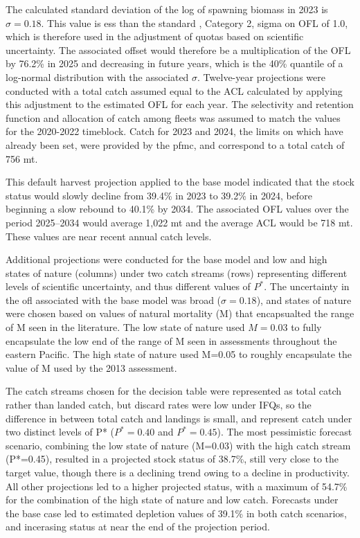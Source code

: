 \documentclass[11pt,
  english,
  letterpaper,
]{article}
\begin{document}
The calculated standard deviation of the log of spawning biomass in 2023 is \(\sigma = 0.18\). This value is ess than the standard , Category 2, sigma on OFL of 1.0, which is therefore used in the adjustment of quotas based on scientific uncertainty. The associated offset would therefore be a multiplication of the OFL by 76.2\% in 2025 and decreasing in future years, which is the 40\% quantile of a log-normal distribution with the associated \(\sigma\). Twelve-year projections were conducted with a total catch assumed equal to the ACL calculated by applying this adjustment to the estimated OFL for each year. The selectivity and retention function and allocation of catch among fleets was assumed to match the values for the 2020-2022 timeblock. Catch for 2023 and 2024, the limits on which have already been set, were provided by the \gls{pfmc}, and correspond to a total catch of 756 mt.

This default harvest projection applied to the base model indicated that the stock status would slowly decline from 39.4\% in 2023 to 39.2\% in 2024, before beginning a slow rebound to 40.1\% by 2034. The associated OFL values over the period 2025--2034 would average 1,022 mt and the average ACL would be 718 mt. These values are near recent annual catch levels.

Additional projections were conducted for the base model and low and high states of nature (columns) under two catch streams (rows) representing different levels of scientific uncertainty, and thus different values of \(P^*\). The uncertainty in the \gls{ofl} associated with the base model was broad (\(\sigma = 0.18\)), and states of nature were chosen based on values of natural mortality (M) that encapsualted the range of M seen in the literature. The low state of nature used \(M=0.03\) to fully encapsulate the low end of the range of M seen in assessments throughout the eastern Pacific. The high state of nature used M=0.05 to roughly encapsulate the value of M used by the 2013 assessment.

The catch streams chosen for the decision table were represented as total catch rather than landed catch, but discard rates were low under IFQs, so the difference in between total catch and landings is small, and represent catch under two distinct levels of P* (\(P^*=0.40\) and \(P^*=0.45\)). The most pessimistic forecast scenario, combining the low state of nature (M=0.03) with the high catch stream (P*=0.45), resulted in a projected stock status of 38.7\%, still very close to the target value, though there is a declining trend owing to a decline in productivity. All other projections led to a higher projected status, with a maximum of 54.7\% for the combination of the high state of nature and low catch. Forecasts under the base case led to estimated depletion values of 39.1\% in both catch scenarios, and incerasing status at near the end of the projection period.
\end{document}
